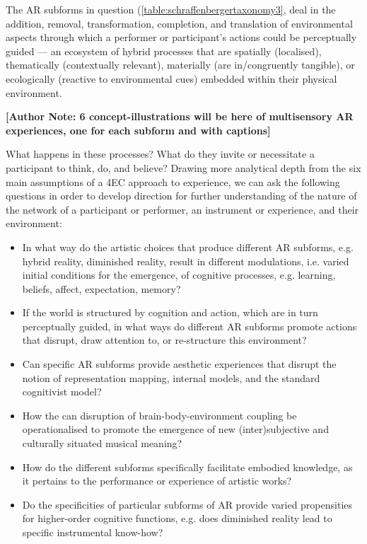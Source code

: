 The AR subforms in question (\autoref{table:schraffenbergertaxonomy3}, deal in the addition, removal, transformation, completion, and translation of environmental aspects through which a performer or participant's actions could be perceptually guided — an ecosystem of hybrid processes that are spatially (localised), thematically (contextually relevant), materially (are in/congruently tangible), or ecologically (reactive to environmental cues) embedded within their physical environment.

\textbf{[Author Note: 6 concept-illustrations will be here of multisensory AR experiences, one for each subform and with captions]}

What happens in these processes?  What do they invite or necessitate a participant to think, do, and believe? Drawing more analytical depth from the six main assumptions of a 4EC approach to experience, we can ask the following questions in order to develop direction for further understanding of the nature of the network of a participant or performer, an instrument or experience, and their environment:
	\begin{itemize}
	    \item In what way do the artistic choices that produce different AR subforms, e.g. hybrid reality, diminished reality, result in different modulations, i.e. varied initial conditions for the emergence, of cognitive processes, e.g. learning, beliefs, affect, expectation, memory?

	    \item If the world is structured by cognition and action, which are in turn perceptually guided, in what ways do different AR subforms promote actions that disrupt, draw attention to, or re-structure this environment?

	    \item Can specific AR subforms provide aesthetic experiences that disrupt the notion of representation mapping, internal models, and the standard cognitivist model?

	    \item How the can disruption of brain-body-environment coupling be operationalised to promote the emergence of new (inter)subjective and culturally situated musical meaning?

	    \item How do the different subforms specifically facilitate embodied knowledge, as it pertains to the performance or experience of artistic works?

	    \item Do the specificities of particular subforms of AR provide varied propensities for higher-order cognitive functions, e.g. does diminished reality lead to specific instrumental know-how?
	\end{itemize}


